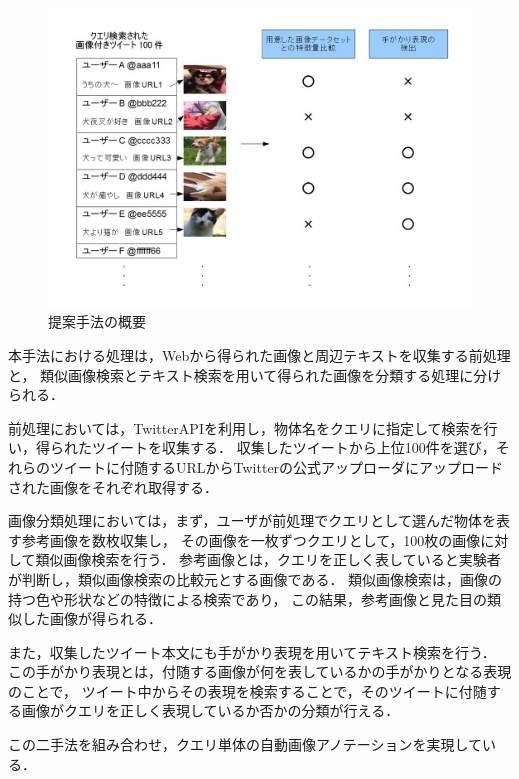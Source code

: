 \begin{figure}[tb]
 \begin{center}
  \includegraphics[scale=0.50]{way.jpg}
 \end{center}
 \caption{提案手法の概要}
 \label{fig:way}
\end{figure}

本手法における処理は，Webから得られた画像と周辺テキストを収集する前処理と，
類似画像検索とテキスト検索を用いて得られた画像を分類する処理に分けられる．

前処理においては，TwitterAPIを利用し，物体名をクエリに指定して検索を行い，得られたツイートを収集する．
収集したツイートから上位100件を選び，それらのツイートに付随するURLからTwitterの公式アップローダにアップロードされた画像をそれぞれ取得する．

画像分類処理においては，まず，ユーザが前処理でクエリとして選んだ物体を表す参考画像を数枚収集し，
その画像を一枚ずつクエリとして，100枚の画像に対して類似画像検索を行う．
参考画像とは，クエリを正しく表していると実験者が判断し，類似画像検索の比較元とする画像である．
類似画像検索は，画像の持つ色や形状などの特徴による検索であり，
この結果，参考画像と見た目の類似した画像が得られる．

また，収集したツイート本文にも手がかり表現を用いてテキスト検索を行う．
この手がかり表現とは，付随する画像が何を表しているかの手がかりとなる表現のことで，
ツイート中からその表現を検索することで，そのツイートに付随する画像がクエリを正しく表現しているか否かの分類が行える．

この二手法を組み合わせ，クエリ単体の自動画像アノテーションを実現している．

